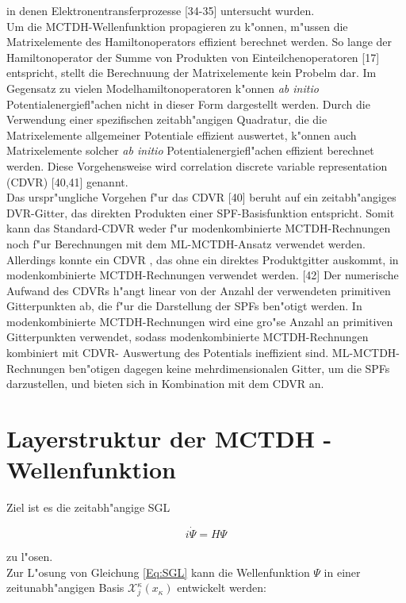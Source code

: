 in denen Elektronentransferprozesse [34-35] untersucht wurden.
 \\Um die MCTDH-Wellenfunktion propagieren zu k"onnen, m"ussen die Matrixelemente des Hamiltonoperators effizient berechnet werden.
So lange der Hamiltonoperator der Summe von Produkten von Einteilchenoperatoren [17] entspricht, stellt die Berechnuung der Matrixelemente kein Probelm dar.
Im Gegensatz zu vielen Modelhamiltonoperatoren k"onnen \textit{ab initio} Potentialenergiefl"achen nicht in dieser Form dargestellt werden.
Durch die Verwendung einer spezifischen zeitabh"angigen Quadratur, die die Matrixelemente allgemeiner Potentiale effizient auswertet, k"onnen
auch Matrixelemente solcher \textit{ab initio} Potentialenergiefl"achen effizient berechnet werden.
Diese Vorgehensweise wird correlation discrete variable representation (CDVR) [40,41] genannt.
 \\Das urspr"ungliche Vorgehen f"ur das CDVR [40] beruht auf ein zeitabh"angiges DVR-Gitter, das direkten Produkten einer SPF-Basisfunktion entspricht.
Somit kann das Standard-CDVR weder f"ur modenkombinierte MCTDH-Rechnungen noch f"ur Berechnungen mit dem ML-MCTDH-Ansatz verwendet werden.
 \\Allerdings konnte ein CDVR , das ohne ein direktes Produktgitter auskommt, in modenkombinierte MCTDH-Rechnungen verwendet werden. [42]
 Der numerische Aufwand des CDVRs h"angt linear von der Anzahl der verwendeten primitiven Gitterpunkten ab, die f"ur die Darstellung der SPFs ben"otigt werden.
In modenkombinierte MCTDH-Rechnungen wird eine gro"se Anzahl an primitiven Gitterpunkten verwendet, sodass modenkombinierte MCTDH-Rechnungen kombiniert mit CDVR-
Auswertung des Potentials ineffizient sind. ML-MCTDH-Rechnungen ben"otigen dagegen keine mehrdimensionalen Gitter, um die SPFs darzustellen, und bieten sich
in Kombination mit dem CDVR an.

\section{Layerstruktur der MCTDH - Wellenfunktion}

Ziel ist es die zeitabh"angige SGL

\begin{equation}
i\dot{\Psi} = H \Psi
\label{Eq:SGL}
\end{equation}

zu l"osen.
  \\Zur L"osung von Gleichung \ref{Eq:SGL} kann die Wellenfunktion $\Psi$ in einer zeitunabh"angigen Basis $\mathcal{X}^{\kappa}_{j}(x_{\kappa})$ entwickelt werden:

